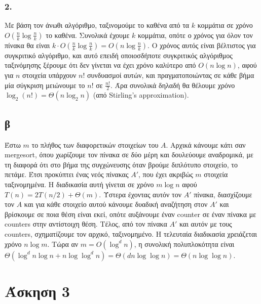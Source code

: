 \documentclass[12pt,a4paper]{article}
\begin{document}
  \subsubsection{2.}
    Με βάση τον άνωθι αλγόριθμο, ταξινομούμε το καθένα από τα \( k \) κομμάτια
    σε χρόνο \( Ο(\frac{n}{k}\log{\frac{n}{k}}) \) το καθένα.
    Συνολικά έχουμε \( k \) κομμάτια, οπότε ο χρόνος για όλον τον πίνακα θα 
    είναι \( k\cdot O(\frac{n}{k}\log{\frac{n}{k}})=O(n\log{\frac{n}{k}}) \).
    Ο χρόνος αυτός είναι βέλτιστος για συγκριτικό αλγόριθμο, και αυτό επειδή 
    οποιοσδήποτε συγκριτικός αλγόριθμος ταξινόμησης ξέρουμε ότι δεν γίνεται να 
    έχει χρόνο καλύτερο από \( O(n\log{n}) \), αφού για \(n\) στοιχεία υπάρχουν
    \(n!\) συνδυασμοί αυτών, και πραγματοποιώντας σε κάθε βήμα μία σύγκριση 
    μειώνουμε το \(n!\) σε \(\frac{n!}{2}\). 
    Άρα συνολικά δηλαδή θα θέλουμε χρόνο \(\log_{2}(n!) = \Theta(n\log_{2}{n})\)
    (από {\latintext Stirling's approximation}).
  
  \subsection{β}
    Έστω \( m \) το πλήθος των διαφορετικών στοιχείων του \( Α \). Αρχικά 
    κάνουμε κάτι σαν {\latintext mergesort}, όπου χωρίζουμε τον πίνακα σε δύο
    μέρη και δουλεύουμε αναδρομικά, με τη διαφορά ότι στο βήμα της συγχώνευσης
    όταν βρούμε διπλότυπο στοιχείο, το πετάμε. Έτσι προκύπτει ένας νεός πίνακας
    \( Α' \), που έχει ακριβώς \( m \) στοιχεία ταξινομημένα. Η διαδικασία αυτή
    γίνεται σε χρόνο \( m\log{n} \) αφού \( T(n)=2T(n/2)+\Theta(m) \). Ύστερα
    έχοντας αυτόν τον \( Α' \) πίνακα, διασχίζουμε τον \( Α \) και για κάθε 
    στοιχείο αυτού κάνουμε δυαδική αναζήτηση στον \(  Α' \) και βρίσκουμε σε 
    ποια θέση είναι εκεί, οπότε αυξάνουμε έναν {\latintext counter} σε έναν 
    πίνακα με {\latintext counters} στην αντίστοιχη θέση. Τέλος, από τον πίνακα
    \( Α' \) και αυτόν με τους {\latintext counters}, σχηματίζουμε τον αρχικό, 
    ταξινομημένο. Η τελευταία διαδικασία χρειάζεται χρόνο \( n\log{m} \).
    Τώρα αν \( m=O(\log^d{n}) \), η συνολική πολυπλοκότητα είναι \( \Theta
    (\log^d{n}\log{n} + n\log{\log^d{n}}) = \Theta(dn\log{\log{n}}) =
    \Theta(n\log{\log{n}}) \).

  \section{Άσκηση 3}
\end{document}
